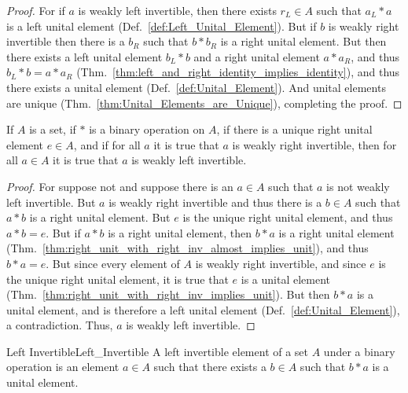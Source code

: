     \begin{proof}
        For if $a$ is weakly left invertible, then there exists $r_{L}\in{A}$
        such that $a_{L}*a$ is a left unital element
        (Def.~\ref{def:Left_Unital_Element}). But if $b$ is weakly right
        invertible then there is a $b_{R}$ such that $b*b_{R}$ is a right
        unital element. But then there exists a left unital element
        $b_{L}*b$ and a right unital element $a*a_{R}$, and thus
        $b_{L}*b=a*a_{R}$
        (Thm.~\ref{thm:left_and_right_identity_implies_identity}), and thus
        there exists a unital element (Def.~\ref{def:Unital_Element}). And
        unital elements are unique (Thm.~\ref{thm:Unital_Elements_are_Unique}),
        completing the proof.
    \end{proof}
    \begin{theorem}
        \label{thm:unique_r_id_and_weak_r_inv_implies_weak_l_inv}%
        If $A$ is a set, if $*$ is a binary operation on $A$, if there is a
        unique right unital element $e\in{A}$, and if for all $a$ it is true
        that $a$ is weakly right invertible, then for all $a\in{A}$ it is true
        that $a$ is weakly left invertible.
    \end{theorem}
    \begin{proof}
        For suppose not and suppose there is an $a\in{A}$ such that $a$ is not
        weakly left invertible. But $a$ is weakly right invertible and thus
        there is a $b\in{A}$ such that $a*b$ is a right unital element. But
        $e$ is the unique right unital element, and thus $a*b=e$. But if
        $a*b$ is a right unital element, then $b*a$ is a right unital element
        (Thm.~\ref{thm:right_unit_with_right_inv_almost_implies_unit}), and
        thus $b*a=e$. But since every element of $A$ is weakly right invertible,
        and since $e$ is the unique right unital element, it is true that
        $e$ is a unital element
        (Thm.~\ref{thm:right_unit_with_right_inv_implies_unit}). But then
        $b*a$ is a unital element, and is therefore a left unital element
        (Def.~\ref{def:Unital_Element}), a contradiction. Thus, $a$ is weakly
        left invertible.
    \end{proof}
    \begin{fdefinition}{Left Invertible}{Left_Invertible}
        A left invertible element of a \gls{set} $A$ under a
        \gls{binary operation} is an element $a\in{A}$ such that there exists a
        $b\in{A}$ such that $b*a$ is a \gls{unital element}.
    \end{fdefinition}
